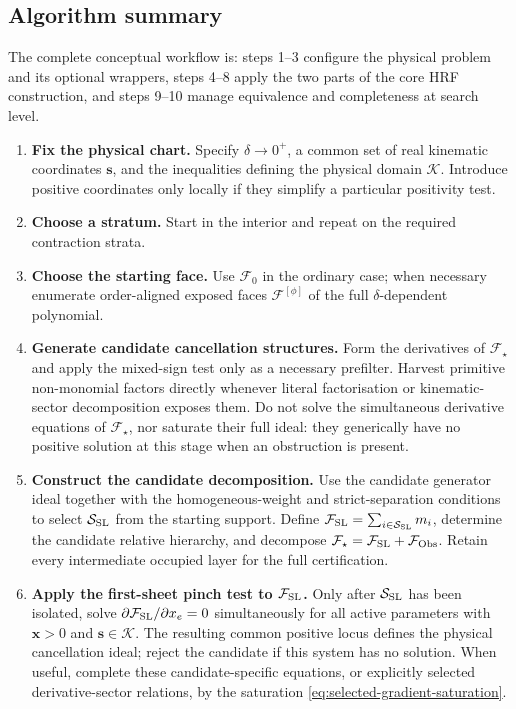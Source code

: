 \documentclass[a4paper,11pt]{article}
\newcommand{\x}{\boldsymbol{x}}
\newcommand{\s}{\boldsymbol{s}}
\newcommand{\K}{\mathcal K}
\newcommand{\FSL}{\mathcal F_{\rm SL}}
\newcommand{\SSL}{\mathcal S_{\rm SL}}
\newcommand{\FObs}{\mathcal F_{\rm Obs}}
\begin{document}
\subsection{Algorithm summary}
\label{sec:workflow}

The complete conceptual workflow is:
steps 1--3 configure the physical problem and its optional wrappers,
steps 4--8 apply the two parts of the core HRF construction, and
steps 9--10 manage equivalence and completeness at search level.
\begin{enumerate}[label=\textbf{\arabic*.},leftmargin=*]
\item \textbf{Fix the physical chart.}
      Specify \(\delta\to0^+\), a common set of real kinematic coordinates
      \(\s\), and the inequalities defining the physical domain \(\K\).
      Introduce positive coordinates only locally if they simplify a
      particular positivity test.
\item \textbf{Choose a stratum.}
      Start in the interior and repeat on the required contraction strata.
\item \textbf{Choose the starting face.}
      Use \(\mathcal F_0\) in the ordinary case; when necessary enumerate
      order-aligned exposed faces \(\mathcal F^{[\phi]}\) of the full
      \(\delta\)-dependent polynomial.
\item \textbf{Generate candidate cancellation structures.}
      Form the derivatives of \(\mathcal F_\star\) and apply the mixed-sign
      test only as a necessary prefilter.  Harvest primitive non-monomial
      factors directly whenever literal factorisation or kinematic-sector
      decomposition exposes them.  Do not solve the simultaneous derivative
      equations of \(\mathcal F_\star\), nor saturate their full ideal: they
      generically have no positive solution at this stage when an obstruction
      is present.
\item \textbf{Construct the candidate decomposition.}
      Use the candidate generator ideal together with the homogeneous-weight
      and strict-separation conditions to select \(\SSL\) from the starting
      support.  Define
      \(\FSL=\sum_{i\in\SSL}m_i\), determine the candidate relative
      hierarchy, and decompose
      \(\mathcal F_\star=\FSL+\FObs\).  Retain every intermediate occupied
      layer for the full certification.
\item \textbf{Apply the first-sheet pinch test to \(\FSL\).}
      Only after \(\SSL\) has been isolated, solve
      \(\partial\FSL/\partial x_e=0\) simultaneously for all active
      parameters with \(\x>0\) and \(\s\in\K\).  The resulting common
      positive locus defines the physical cancellation ideal; reject the
      candidate if this system has no solution.  When useful, complete these
      candidate-specific equations, or explicitly selected derivative-sector
      relations, by the saturation \eqref{eq:selected-gradient-saturation}.


\end{enumerate}
\end{document}

